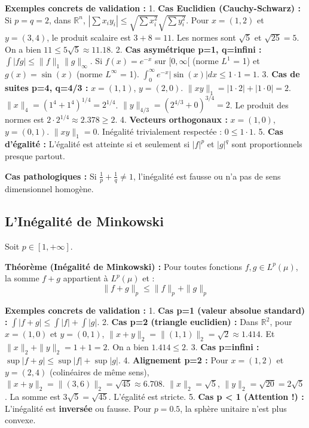 \documentclass[11pt,a4paper]{article}
\begin{document}
\textbf{Exemples concrets de validation :}
1. \textbf{Cas Euclidien (Cauchy-Schwarz) :} Si $p=q=2$, dans $\mathbb{R}^n$, $|\sum x_i y_i| \le \sqrt{\sum x_i^2} \sqrt{\sum y_i^2}$. Pour $x=(1, 2)$ et $y=(3, 4)$, le produit scalaire est $3+8=11$. Les normes sont $\sqrt{5}$ et $\sqrt{25}=5$. On a bien $11 \le 5\sqrt{5} \approx 11.18$.
2. \textbf{Cas asymétrique p=1, q=infini :} $\int |fg| \le \|f\|_1 \|g\|_\infty$. Si $f(x) = e^{-x}$ sur $[0, \infty[$ (norme $L^1$ = 1) et $g(x) = \sin(x)$ (norme $L^\infty$ = 1). $\int_0^\infty e^{-x}|\sin(x)| dx \le 1 \cdot 1 = 1$.
3. \textbf{Cas de suites p=4, q=4/3 :} $x = (1, 1)$, $y = (2, 0)$. $\|xy\|_1 = |1 \cdot 2| + |1 \cdot 0| = 2$. $\|x\|_4 = (1^4 + 1^4)^{1/4} = 2^{1/4}$. $\|y\|_{4/3} = (2^{4/3} + 0)^{3/4} = 2$. Le produit des normes est $2 \cdot 2^{1/4} \approx 2.378 \ge 2$.
4. \textbf{Vecteurs orthogonaux :} $x = (1, 0)$, $y = (0, 1)$. $\|xy\|_1 = 0$. Inégalité trivialement respectée : $0 \le 1 \cdot 1$.
5. \textbf{Cas d'égalité :} L'égalité est atteinte si et seulement si $|f|^p$ et $|g|^q$ sont proportionnels presque partout.

\textbf{Cas pathologiques :} Si $\frac{1}{p} + \frac{1}{q} \neq 1$, l'inégalité est fausse ou n'a pas de sens dimensionnel homogène.

\subsection{L'Inégalité de Minkowski}

Soit $p \in [1, +\infty]$.

\textbf{Théorème (Inégalité de Minkowski) :}
Pour toutes fonctions $f, g \in L^p(\mu)$, la somme $f+g$ appartient à $L^p(\mu)$ et :
$$ \|f+g\|_p \le \|f\|_p + \|g\|_p $$

\textbf{Exemples concrets de validation :}
1. \textbf{Cas p=1 (valeur absolue standard) :} $\int |f+g| \le \int |f| + \int |g|$.
2. \textbf{Cas p=2 (triangle euclidien) :} Dans $\mathbb{R}^2$, pour $x=(1,0)$ et $y=(0,1)$, $\|x+y\|_2 = \|(1,1)\|_2 = \sqrt{2} \approx 1.414$. Et $\|x\|_2 + \|y\|_2 = 1 + 1 = 2$. On a bien $1.414 \le 2$.
3. \textbf{Cas p=infini :} $\sup |f+g| \le \sup |f| + \sup |g|$.
4. \textbf{Alignement p=2 :} Pour $x=(1,2)$ et $y=(2,4)$ (colinéaires de même sens), $\|x+y\|_2 = \|(3,6)\|_2 = \sqrt{45} \approx 6.708$. $\|x\|_2 = \sqrt{5}$, $\|y\|_2 = \sqrt{20} = 2\sqrt{5}$. La somme est $3\sqrt{5} = \sqrt{45}$. L'égalité est stricte.
5. \textbf{Cas p < 1 (Attention !) :} L'inégalité est \textbf{inversée} ou fausse. Pour $p=0.5$, la sphère unitaire n'est plus convexe.
\end{document}
